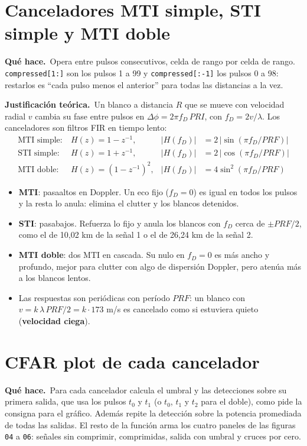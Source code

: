 \documentclass[11pt]{article}
\newcommand{\codigo}[2]{}
\newcommand{\teoria}{\par\textcolor{verde}{\textbf{Justificación teórica.}}\ }
\newcommand{\hace}{\par\textcolor{verde}{\textbf{Qué hace.}}\ }
\newcommand{\archivo}[1]{\texttt{#1}}
\begin{document}
\section{Canceladores MTI simple, STI simple y MTI doble}
\codigo{153}{155}
\hace Opera entre pulsos consecutivos, celda de rango por celda de rango. \archivo{compressed[1:]} son los pulsos 1 a 99 y \archivo{compressed[:-1]} los pulsos 0 a 98: restarlos es ``cada pulso menos el anterior'' para todas las distancias a la vez.

\teoria Un blanco a distancia $R$ que se mueve con velocidad radial $v$ cambia su fase entre pulsos en $\Delta\phi = 2\pi f_D\,PRI$, con $f_D = 2v/\lambda$. Los canceladores son filtros FIR en tiempo lento:
\begin{align*}
  \text{MTI simple:}\ & H(z) = 1 - z^{-1}, & |H(f_D)| &= 2\,|\sin(\pi f_D/PRF)| \\
  \text{STI simple:}\ & H(z) = 1 + z^{-1}, & |H(f_D)| &= 2\,|\cos(\pi f_D/PRF)| \\
  \text{MTI doble:}\ & H(z) = (1 - z^{-1})^2, & |H(f_D)| &= 4\sin^2(\pi f_D/PRF)
\end{align*}
\begin{itemize}
  \item \textbf{MTI}: pasaaltos en Doppler. Un eco fijo ($f_D = 0$) es igual en todos los pulsos y la resta lo anula: elimina el clutter y los blancos detenidos.
  \item \textbf{STI}: pasabajos. Refuerza lo fijo y anula los blancos con $f_D$ cerca de $\pm PRF/2$, como el de 10,02 km de la señal 1 o el de 26,24 km de la señal 2.
  \item \textbf{MTI doble}: dos MTI en cascada. Su nulo en $f_D = 0$ es más ancho y profundo, mejor para clutter con algo de dispersión Doppler, pero atenúa más a los blancos lentos.
  \item Las respuestas son periódicas con período $PRF$: un blanco con $v = k\,\lambda\,PRF/2 = k \cdot 173$ m/s es cancelado como si estuviera quieto (\textbf{velocidad ciega}).
\end{itemize}

\section{CFAR plot de cada cancelador}
\codigo{193}{201}
\codigo{226}{228}
\hace Para cada cancelador calcula el umbral y las detecciones sobre su primera salida, que usa los pulsos $t_0$ y $t_1$ (o $t_0$, $t_1$ y $t_2$ para el doble), como pide la consigna para el gráfico. Además repite la detección sobre la potencia promediada de todas las salidas. El resto de la función arma los cuatro paneles de las figuras \archivo{04} a \archivo{06}: señales sin comprimir, comprimidas, salida con umbral y cruces por cero.
\end{document}
